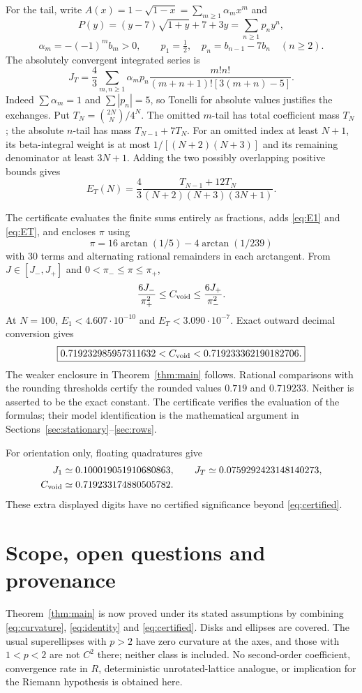 \documentclass[11pt,a4paper]{article}
\theoremstyle{remark}\newtheorem{remark}{Remark}
\numberwithin{equation}{section}
\begin{document}
For the tail, write $A(x)=1-\sqrt{1-x}=\sum_{m\ge1}\alpha_mx^m$ and
\[
 P(y)=(y-7)\sqrt{1+y}+7+3y=\sum_{n\ge1}p_ny^n,
\]
\[
 \alpha_m=-(-1)^mb_m>0,
 \qquad p_1=\tfrac12,\quad p_n=b_{n-1}-7b_n\quad(n\ge2).
\]
The absolutely convergent integrated series is
\begin{equation}\label{eq:JTseries}
 J_T=\frac43\sum_{m,n\ge1}\alpha_mp_n
 \frac{m!n!}{(m+n+1)![3(m+n)-5]}.
\end{equation}
Indeed $\sum\alpha_m=1$ and $\sum|p_n|=5$, so Tonelli for absolute values justifies the exchanges. Put $T_N=\binom{2N}{N}/4^N$. The omitted $m$-tail has total coefficient mass $T_N$; the absolute $n$-tail has mass $T_{N-1}+7T_N$. For an omitted index at least $N+1$, its beta-integral weight is at most $1/[(N+2)(N+3)]$ and its remaining denominator at least $3N+1$. Adding the two possibly overlapping positive bounds gives
\begin{equation}\label{eq:ET}
 E_T(N)=\frac43\frac{T_{N-1}+12T_N}{(N+2)(N+3)(3N+1)}.
\end{equation}

The certificate evaluates the finite sums entirely as fractions, adds \eqref{eq:E1} and \eqref{eq:ET}, and encloses $\pi$ using
\[
 \pi=16\arctan(1/5)-4\arctan(1/239)
\]
with 30 terms and alternating rational remainders in each arctangent. From $J\in[J_-,J_+]$ and $0<\pi_-\le\pi\le\pi_+$,
\[
 \frac{6J_-}{\pi_+^2}\le C_{\mathrm{void}}\le\frac{6J_+}{\pi_-^2}.
\]
At $N=100$, $E_1<4.607\cdot10^{-10}$ and $E_T<3.090\cdot10^{-7}$. Exact outward decimal conversion gives
\begin{equation}\label{eq:certified}
 \boxed{0.719232985957311632<C_{\mathrm{void}}<0.719233362190182706.}
\end{equation}
The weaker enclosure in Theorem~\ref{thm:main} follows. Rational comparisons with the rounding thresholds certify the rounded values $0.719$ and $0.719233$. Neither is asserted to be the exact constant. The certificate verifies the evaluation of the formulas; their model identification is the mathematical argument in Sections~\ref{sec:stationary}--\ref{sec:rows}.

For orientation only, floating quadratures give
\begin{align*}
 J_1&\simeq0.100019051910680863,\qquad J_T\simeq0.0759292423148140273,\\
 C_{\mathrm{void}}&\simeq0.719233174880505782.
\end{align*}
These extra displayed digits have no certified significance beyond \eqref{eq:certified}.

\section{Scope, open questions and provenance}
Theorem~\ref{thm:main} is now proved under its stated assumptions by combining \eqref{eq:curvature}, \eqref{eq:identity} and \eqref{eq:certified}. Disks and ellipses are covered. The usual superellipses with $p>2$ have zero curvature at the axes, and those with $1<p<2$ are not $C^2$ there; neither class is included. No second-order coefficient, convergence rate in $R$, deterministic unrotated-lattice analogue, or implication for the Riemann hypothesis is obtained here.
\end{document}
